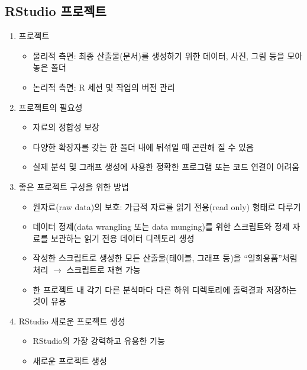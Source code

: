 \documentclass[12pt,a4paper]{book}
\providecommand{\tightlist}{%
  \setlength{\itemsep}{0pt}\setlength{\parskip}{0pt}}
\theoremstyle{definition}
\theoremstyle{definition}
\theoremstyle{definition}
\theoremstyle{remark}
\begin{document}
\subsection{RStudio 프로젝트}\label{rstudio-}

\begin{enumerate}
\def\labelenumi{\arabic{enumi}.}
\tightlist
\item
  프로젝트

  \begin{itemize}
  \tightlist
  \item
    물리적 측면: 최종 산출물(문서)를 생성하기 위한 데이터, 사진, 그림
    등을 모아 놓은 폴더
  \item
    논리적 측면: R 세션 및 작업의 버전 관리
  \end{itemize}
\item
  프로젝트의 필요성

  \begin{itemize}
  \tightlist
  \item
    자료의 정합성 보장
  \item
    다양한 확장자를 갖는 한 폴더 내에 뒤섞일 때 곤란해 질 수 있음
  \item
    실제 분석 및 그래프 생성에 사용한 정확한 프로그램 또는 코드 연결이
    어려움
  \end{itemize}
\item
  좋은 프로젝트 구성을 위한 방법

  \begin{itemize}
  \tightlist
  \item
    원자료(raw data)의 보호: 가급적 자료를 읽기 전용(read only) 형태로
    다루기
  \item
    데이터 정제(data wrangling 또는 data munging)를 위한 스크립트와 정제
    자료를 보관하는 읽기 전용 데이터 디렉토리 생성
  \item
    작성한 스크립트로 생성한 모든 산출물(테이블, 그래프 등)을
    ``일회용품''처럼 처리 \(\rightarrow\) 스크립트로 재현 가능
  \item
    한 프로젝트 내 각기 다른 분석마다 다른 하위 디렉토리에 출력결과
    저장하는 것이 유용
  \end{itemize}
\item
  RStudio 새로운 프로젝트 생성

  \begin{itemize}
  \tightlist
  \item
    RStudio의 가장 강력하고 유용한 기능
  \item
    새로운 프로젝트 생성


\end{itemize}
\end{enumerate}
\end{document}
